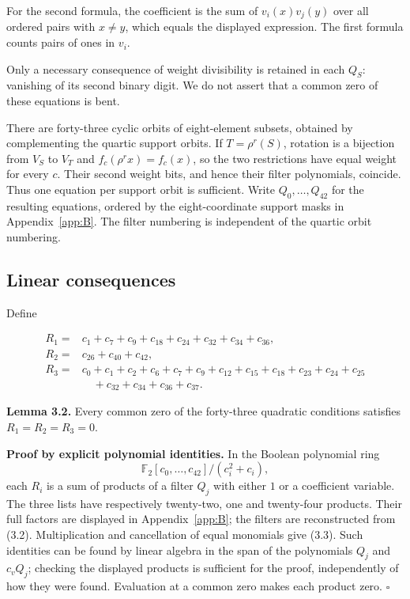 \documentclass[pdflatex,sn-mathphys-num]{sn-jnl}
\begin{document}
For the second formula, the coefficient is the sum of $v_i(x)v_j(y)$ over all ordered pairs with $x\ne y$, which equals the displayed expression. The first formula counts pairs of ones in $v_i$.

Only a necessary consequence of weight divisibility is retained in each $Q_S$: vanishing of its second binary digit. We do not assert that a common zero of these equations is bent.

There are forty-three cyclic orbits of eight-element subsets, obtained by complementing the quartic support orbits. If $T=\rho^r(S)$, rotation is a bijection from $V_S$ to $V_T$ and $f_c(\rho^r x)=f_c(x)$, so the two restrictions have equal weight for every $c$. Their second weight bits, and hence their filter polynomials, coincide. Thus one equation per support orbit is sufficient. Write $Q_0,\ldots,Q_{42}$ for the resulting equations, ordered by the eight-coordinate support masks in Appendix~\ref{app:B}. The filter numbering is independent of the quartic orbit numbering.

\subsection{Linear consequences}\label{subsec:3:2}

Define

\[
\begin{aligned}
R_1={}&c_1+c_7+c_9+c_{18}+c_{24}+c_{32}+c_{34}+c_{36},\\
R_2={}&c_{26}+c_{40}+c_{42},\\
R_3={}&c_0+c_1+c_2+c_6+c_7+c_9+c_{12}+c_{15}+c_{18}
       +c_{23}+c_{24}+c_{25}\\&\quad+c_{32}+c_{34}+c_{36}+c_{37}.
\end{aligned} \tag{3.3}
\]

\textbf{Lemma 3.2.} Every common zero of the forty-three quadratic conditions satisfies $R_1=R_2=R_3=0$.

\textbf{Proof by explicit polynomial identities.} In the Boolean polynomial ring
\[\mathbb F_2[c_0,\ldots,c_{42}]/(c_i^2+c_i),\]
each $R_i$ is a sum of products of a filter $Q_j$ with either $1$ or a coefficient variable. The three lists have respectively twenty-two, one and twenty-four products. Their full factors are displayed in Appendix~\ref{app:B}; the filters are reconstructed from (3.2). Multiplication and cancellation of equal monomials give (3.3). Such identities can be found by linear algebra in the span of the polynomials $Q_j$ and $c_vQ_j$; checking the displayed products is sufficient for the proof, independently of how they were found. Evaluation at a common zero makes each product zero. \hfill$\square$
\end{document}
